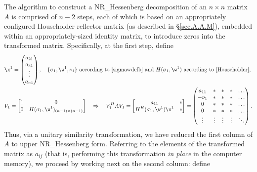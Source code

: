 The algorithm to construct a NR_Hessenberg decomposition of an $n\times
n$ matrix $A$ is comprised of $n-2$ steps, each of which is based
on an appropriately configured Householder reflector matrix (as
described in \S \ref{sec.A.A.M}), embedded within an appropriately-sized identity matrix, to introduce zeros into the
transformed matrix.  Specifically, at the first step, define
\begin{align*}
    &\x^{1}=\begin{pmatrix} a_{21} \\ a_{31} \\ \vdots \\ a_{n1} \end{pmatrix}, \quad
    \textrm{$\{\sigma_{1},\w^{1},\nu_{1}\}$ according to \eqref{sigmawdefb} and $H(\sigma_{1},\w^{1})$
    according to \eqref{Householder},}\\
    &V_{1}=\begin{bmatrix} 1 & 0 \\ 0 & H(\sigma_{1},\w^{1})_{(n-1)\times (n-1)} \end{bmatrix}
    \quad \Rightarrow \quad
    V_{1}^{H}A V_{1}=\begin{bmatrix} a_{11} & * \\ H^{H}(\sigma_{1},\w^{1})\x^{1} & * \end{bmatrix} =
    \begin{pmatrix} a_{11}     & * & * & * & \hdots \\
				      -\nu_{1} & * & * & * & \hdots \\
				      0          & * & * & * & \hdots \\
				      0          & * & * & * & \hdots \\
				      \vdots     & \vdots & \vdots & \vdots & \ddots \end{pmatrix}.
\end{align*}
Thus, via a unitary similarity transformation, we have reduced the first
column of $A$ to upper NR_Hessenberg form.  Referring to the elements of the
transformed matrix as $a_{ij}$ (that is, performing this
transformation {\it in place} in the computer memory), we proceed by
working next on the second column: define
\clearpage
